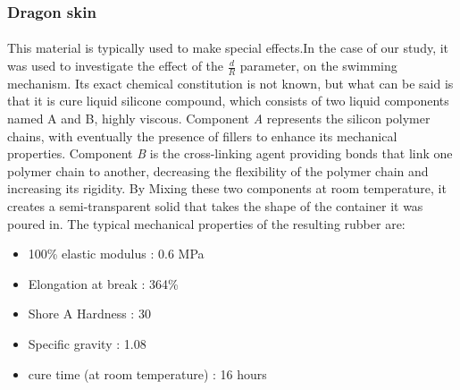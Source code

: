 \subsubsection{Dragon skin} 
\paragraph{}
This material is typically used to make special effects.In the case of our study, it was used to investigate the effect of the $\frac{d}{R}$ parameter, on the swimming mechanism. Its exact chemical constitution is not known, but what can be said is that it is cure liquid silicone compound, which consists of two liquid components named A and B, highly viscous. Component \emph{A} represents the silicon polymer chains, with eventually the presence of fillers to enhance its mechanical properties. Component \emph{B} is the cross-linking agent providing bonds that link one polymer chain to another, decreasing the flexibility of the polymer chain and increasing its rigidity. By Mixing these two components at room temperature, it creates a semi-transparent solid that takes the shape of the container it was poured in.
The typical mechanical properties of the resulting rubber are:
\begin{itemize}
	\item 100\% elastic modulus : 0.6 MPa
	\item Elongation at break : 364\%
	\item Shore A Hardness : 30 
	\item Specific gravity : 1.08 
	\item cure time (at room temperature) : 16 hours
\end{itemize}

